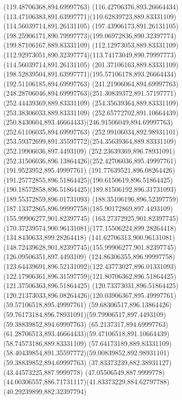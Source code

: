 {{		\lineto(119.48706368,894.69997763)
		\curveto(116.42706376,893.26664434)(113.47106383,891.63997771)(110.62839723,889.83331109)
		\moveto(114.56039714,891.26131105)
		\lineto(197.43906173,891.26131105)
		\curveto(198.25906171,890.79997773)(199.06972836,890.32397774)(199.87106167,889.83331109)
		\lineto(112.12973053,889.83331109)
		\curveto(112.92973051,890.32397774)(113.74173049,890.79997773)(114.56039714,891.26131105)
		\moveto(201.37106163,889.83331109)
		\curveto(198.52839504,891.63997771)(195.57106178,893.26664434)(192.51106185,894.69997763)
		\lineto(241.21906064,894.69997763)
		\curveto(248.28706046,894.69997763)(251.30839372,891.57197771)(252.44439369,889.83331109)
		\closepath
		\moveto(254.35639364,889.83331109)
		\lineto(253.38306033,889.83331109)
		\curveto(252.65772702,891.10664439)(250.8430604,893.46664433)(246.91506049,894.69997763)
		\lineto(252.61106035,894.69997763)
		\curveto(252.99106034,892.98931101)(253.59372699,891.35597772)(254.35639364,889.83331109)
		\moveto(252.19906036,897.4493109)
		\curveto(252.23639369,896.78931091)(252.31506036,896.13864426)(252.42706036,895.49997761)
		\lineto(191.9523952,895.49997761)
		\curveto(191.77639521,896.08264426)(191.25772855,896.51864425)(190.6150619,896.51864425)
		\curveto(190.18572858,896.51864425)(189.81506192,896.31731093)(189.55372859,896.01731093)
		\curveto(188.35106196,896.52397759)(187.13372865,896.99997758)(185.90172869,897.4493109)
		\closepath
		\moveto(155.99906277,901.82397745)
		\curveto(163.27372925,901.82397745)(170.37239574,900.96131081)(177.15506224,899.28264418)
		\lineto(134.8430633,899.28264418)
		\curveto(141.62706313,900.96131081)(148.72439628,901.82397745)(155.99906277,901.82397745)
		\moveto(126.09506351,897.4493109)
		\curveto(124.86306355,896.99997758)(123.64439691,896.52131092)(122.43773027,896.01331093)
		\curveto(122.17906361,896.31597759)(121.80706362,896.51864425)(121.37506363,896.51864425)
		\curveto(120.73373031,896.51864425)(120.21373033,896.08264426)(120.03906367,895.49997761)
		\lineto(59.57106518,895.49997761)
		\curveto(59.68306517,896.13864426)(59.76173184,896.78931091)(59.79906517,897.4493109)
		\closepath
		\moveto(59.38839852,894.69997763)
		\lineto(65.2137317,894.69997763)
		\curveto(61.28706513,893.46664433)(59.47106518,891.10664439)(58.74573186,889.83331109)
		\lineto(57.64173189,889.83331109)
		\curveto(58.40439854,891.35597772)(59.00839852,892.98931101)(59.38839852,894.69997763)
		\moveto(37.83373239,882.38931127)
		\lineto(43.44573225,887.9999778)
		\lineto(47.05506549,887.9999778)
		\curveto(44.00306557,886.71731117)(41.83373229,884.62797788)(40.29239899,882.32397794)
}}
